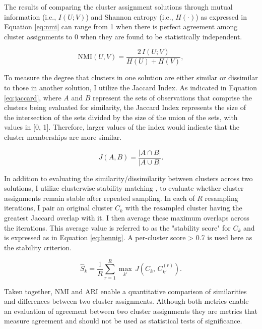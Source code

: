 The results of comparing the cluster assignment solutions through mutual information (i.e., $I(U;V)$) and Shannon entropy (i.e., \(H(\cdot)\)) \parencite{shannon1948mathematical} as expressed in Equation \ref{eq:nmi} can range from 1 when there is perfect agreement among cluster assignments to 0 when they are found to be statistically independent.

\begin{equation}\label{eq:nmi}
\mathrm{NMI}(U,V)=\frac{2\,I(U;V)}{H(U)+H(V)},
\end{equation}

To measure the degree that clusters in one solution are either similar or dissimilar to those in another solution, I utilize the Jaccard Index. As indicated in Equation \ref{eq:jaccard}, where \(A\) and \(B\) represent the sets of observations that comprise the clusters being evaluated for similarity, the Jaccard Index represents the size of the intersection of the sets divided by the size of the union of the sets, with values in [0, 1]. Therefore, larger values of the index would indicate that the cluster memberships are more similar.

\begin{equation}\label{eq:jaccard}
J(A,B)=\frac{|A\cap B|}{|A\cup B|}.
\end{equation}

In addition to evaluating the similarity/dissimilarity between clusters across two solutions, I utilize clusterwise stability matching \parencite{hennig2007cluster}, to evaluate whether cluster assignments remain stable after repeated sampling. In each of \(R\) resampling iterations, I pair an original cluster \(C_k\) with the resampled cluster having the greatest Jaccard overlap with it. I then average these maximum overlaps across the iterations. This average value is referred to as the "stability score" for \(C_k\) and is expressed as in Equation \ref{eq:hennig}. A per-cluster score > 0.7 is used here as the stability criterion.

\begin{equation}\label{eq:hennig}
\hat{S}_k=\frac{1}{R}\sum_{r=1}^{R}\max_{k'}\,J\!\left(C_k,\,C_{k'}^{(r)}\right).
\end{equation}

\enlargethispage{2\baselineskip}
Taken together, NMI and ARI enable a quantitative comparison of similarities and differences between two cluster assignments. Although both metrics enable an evaluation of agreement between two cluster assignments they are metrics that measure agreement and should not be used as statistical tests of significance.
